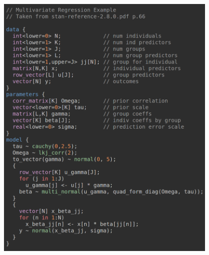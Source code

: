 \documentclass{beamer}
\begin{document}
\begin{frame}
\begin{columns}
\begin{column}{0.5\textwidth}
\end{column}
\begin{column}{0.5\textwidth}
\begin{figure}
    \centering
    \includegraphics[width=.9\linewidth]{stan_example.png}
\end{figure}
\end{column}
\end{columns}
    

\end{frame}

\end{document}
